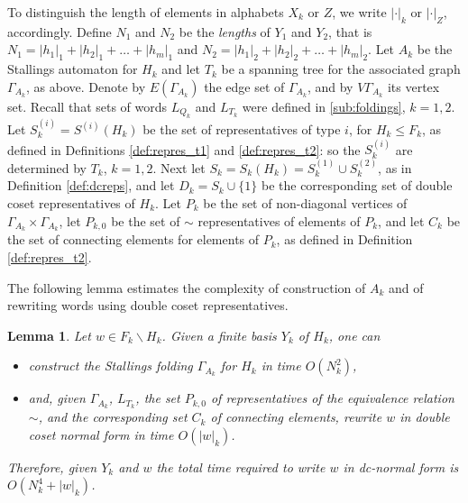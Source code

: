 \documentclass[a4paper,12pt]{article}
\newcommand{\G}{\Gamma }
\newtheorem{lemma}[theorem]{Lemma}
\numberwithin{equation}{section}
\numberwithin{figure}{section}
\begin{document}
To distinguish the length of elements in alphabets $X_k$ or
$Z$, we write $|\cdot|_k$ or $|\cdot|_Z$, accordingly. Define  $N_1$ and $N_2$
be the \emph{lengths} of $Y_1$ and $Y_2$, that is
$N_1 = |h_1|_1 + |h_2|_1 + \ldots + |h_m|_1$ and $N_2 = |h_1|_2 +
|h_2|_2 + \ldots + |h_m|_2$. Let $A_k$ be the Stallings automaton
for $H_k$ and let $T_k$ be a spanning tree for the associated
graph $\G_{A_k}$, as above. Denote by $E(\G_{A_k})$ the  edge set
of $\G_{A_k}$, and by $V\G_{A_k}$  its vertex set.
Recall that sets of words  $L_{Q_k}$ and $L_{T_k}$
were defined in \ref{sub:foldings}, $k=1,2$. Let 
 $S_k^{(i)}=S^{(i)}(H_k)$ be the set
of representatives of type $i$,  for $H_k\le F_k$, as defined  in Definitions \ref{def:repres_t1}
and \ref{def:repres_t2}: so the  
$S_k^{(i)}$ are determined by  $T_k$, $k=1,2$. 
Next let 
$S_k=S_k(H_k)=S_k^{(1)}\cup S_k^{(2)}$, 
as in Definition  \ref{def:dcreps},   and let 
$D_k=S_k\cup\{1\}$ be the corresponding  
 set of
double coset representatives of $H_k$.  
Let $P_k$ be the set of non-diagonal
vertices of $\G_{A_k}\times \G_{A_k}$, let $P_{k,0}$ be the set of
$\sim$ representatives of elements of $P_k$, and let $C_k$ be
the set of connecting elements for elements of $P_k$, as defined in
Definition \ref{def:repres_t2}.


The following lemma estimates the complexity of
construction of $A_k$ and of rewriting words using
double coset representatives.
\begin{lemma}\label{lem:dctransversal} Let $w \in F_k \smallsetminus H_k$. Given a finite basis $Y_k$ of $H_k$, one can
\begin{itemize}
\item construct the Stallings folding $\G_{A_k}$ for $H_k$ in time $O(N_k^2)$,
\item and, given $\G_{A_k}$, $L_{T_k}$, the set $P_{k,0}$  of
 representatives of the equivalence relation $\sim$, and the
corresponding  set $C_k$ of connecting elements,
rewrite $w$ in  double coset normal
form in time  $O(|w|_k)$.
\end{itemize}
Therefore, given $Y_k$ and $w$ the total time required to write $w$ in dc-normal
 form is  $O(N_k^4 + |w|_k)$.
\end{lemma}
\end{document}
